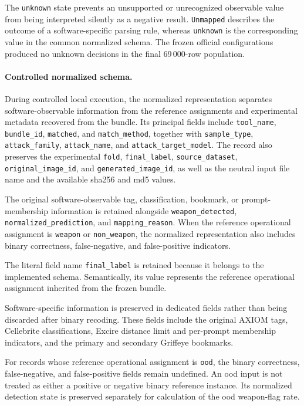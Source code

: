 The \texttt{unknown} state prevents an unsupported or unrecognized observable
value from being interpreted silently as a negative result.
\texttt{Unmapped} describes the outcome of a software-specific parsing rule,
whereas \texttt{unknown} is the corresponding value in the common normalized
schema. The frozen official configurations produced no unknown decisions in the
final 69\,000-row population.

\paragraph{Controlled normalized schema.}

During controlled local execution, the normalized representation separates
software-observable information from the reference assignments and experimental
metadata recovered from the bundle. Its principal fields include
\texttt{tool\_name}, \texttt{bundle\_id}, \texttt{matched}, and
\texttt{match\_method}, together with \texttt{sample\_type},
\texttt{attack\_family}, \texttt{attack\_name}, and
\texttt{attack\_target\_model}. The record also preserves the experimental
\texttt{fold}, \texttt{final\_label}, \texttt{source\_dataset},
\texttt{original\_image\_id}, and \texttt{generated\_image\_id}, as well as
the neutral input file name and the available \gls{sha256} and \gls{md5}
values.

The original software-observable tag, classification, bookmark, or
prompt-membership information is retained alongside
\texttt{weapon\_detected}, \texttt{normalized\_prediction}, and
\texttt{mapping\_reason}. When the reference operational assignment is
\texttt{weapon} or \texttt{non\_weapon}, the normalized representation also
includes binary correctness, false-negative, and false-positive indicators.

The literal field name \texttt{final\_label} is retained because it belongs to
the implemented schema. Semantically, its value represents the reference
operational assignment inherited from the frozen bundle.

Software-specific information is preserved in dedicated fields rather than
being discarded after binary recoding. These fields include the original AXIOM
tags, Cellebrite classifications, Excire distance limit and per-prompt
membership indicators, and the primary and secondary Griffeye bookmarks.

For records whose reference operational assignment is \texttt{ood}, the binary
correctness, false-negative, and false-positive fields remain undefined. An
\gls{ood} input is not treated as either a positive or negative binary reference
instance. Its normalized detection state is preserved separately for
calculation of the \gls{ood} weapon-flag rate.

